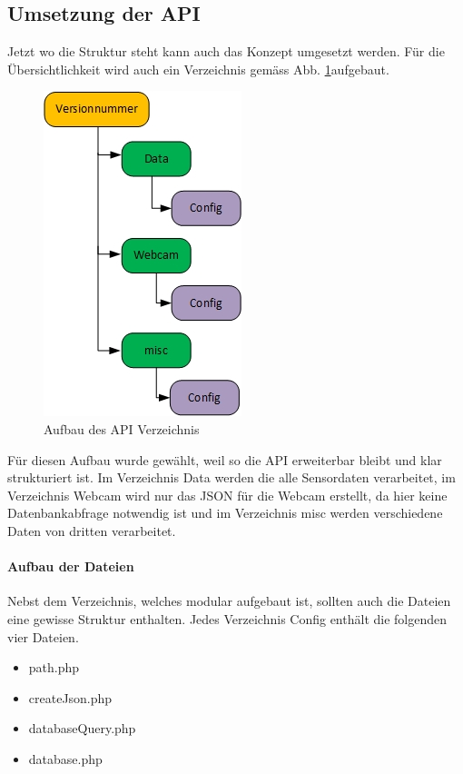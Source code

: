 \subsection{Umsetzung der API}
Jetzt wo die Struktur steht kann auch das Konzept umgesetzt werden. Für die Übersichtlichkeit wird auch ein Verzeichnis gemäss Abb. \ref{img:APIVerzeichnis}aufgebaut.


\begin{figure}[h!]
	\centering
	\includegraphics[width=0.3\linewidth]{img/APIVerzeichnis.jpg}
	\caption{Aufbau des API Verzeichnis}
	\label{img:APIVerzeichnis}
\end{figure}

Für diesen Aufbau wurde gewählt, weil so die API erweiterbar bleibt und klar strukturiert ist. Im Verzeichnis Data werden die alle Sensordaten verarbeitet, im Verzeichnis Webcam wird nur das JSON für die Webcam erstellt, da hier keine Datenbankabfrage notwendig ist und im Verzeichnis misc werden verschiedene Daten von dritten verarbeitet.

\paragraph{Aufbau der Dateien}
Nebst dem Verzeichnis, welches modular aufgebaut ist, sollten auch die Dateien eine gewisse Struktur enthalten. Jedes Verzeichnis Config enthält die folgenden vier Dateien. 
\begin{itemize}
\item path.php
\item createJson.php
\item databaseQuery.php
\item database.php
\end{itemize}

